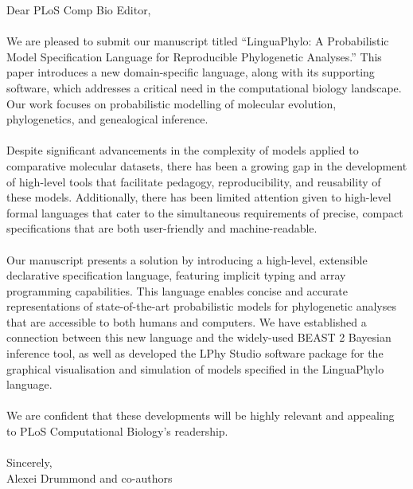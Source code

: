 \documentclass{article}
\begin{document}
\noindent Dear PLoS Comp Bio Editor,
\\\\
We are pleased to submit our manuscript titled ``LinguaPhylo: A Probabilistic Model Specification Language for Reproducible Phylogenetic Analyses.'' This paper introduces a new domain-specific language, along with its supporting software, which addresses a critical need in the computational biology landscape. Our work focuses on probabilistic modelling of molecular evolution, phylogenetics, and genealogical inference.
\\\\
\noindent Despite significant advancements in the complexity of models applied to comparative molecular datasets, there has been a growing gap in the development of high-level tools that facilitate pedagogy, reproducibility, and reusability of these models. Additionally, there has been limited attention given to high-level formal languages that cater to the simultaneous requirements of precise, compact specifications that are both user-friendly and machine-readable.
\\\\
\noindent Our manuscript presents a solution by introducing a high-level, extensible declarative specification language, featuring implicit typing and array programming capabilities. This language enables concise and accurate representations of state-of-the-art probabilistic models for phylogenetic analyses that are accessible to both humans and computers. We have established a connection between this new language and the widely-used BEAST 2 Bayesian inference tool, as well as developed the LPhy Studio software package for the graphical visualisation and simulation of models specified in the LinguaPhylo language.
\\\\
\noindent We are confident that these developments will be highly relevant and appealing to PLoS Computational Biology's readership.
\\\\
\noindent Sincerely,\\
Alexei Drummond and co-authors
\end{document}

